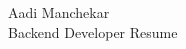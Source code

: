\documentclass{article}
\begin{document}
\begin{center}
    \Huge Aadi Manchekar \\
    \Large Backend Developer Resume
\end{center}
\end{document}
